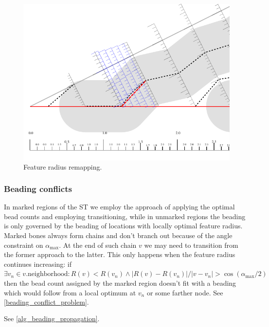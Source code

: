 \begin{figure}
\centering
\includegraphics[width=.9\columnwidth]{sources/method/distance_rounding_transition.pdf}
\caption{Feature radius remapping.}
\label{distance_rounding_transition}
\end{figure}


\subsubsection{Beading conflicts}
In marked regions of the ST we employ the approach of applying the optimal bead counts and employing transitioning, while in unmarked regions the beading is only governed by the beading of locations with locally optimal feature radius.
Marked bones always form chains and don't branch out because of the angle constraint on $\alpha_\text{max}$. 
At the end of such chain $v$ we may need to transition from the former approach to the latter.
This only happens when the feature radius continues increasing: if $\exists v_n \in v.\text{neighborhood}: R(v) < R(v_n) \land | R(v) - R(v_n) | / |v - v_n| >  \cos(\alpha_\text{max} / 2)$ then the bead count assigned by the marked region doesn't fit with a beading which would follow from a local optimum at $v_n$ or some farther node.
See \cref{beading_conflict_problem}.


See \cref{alg_beading_propagation}.

